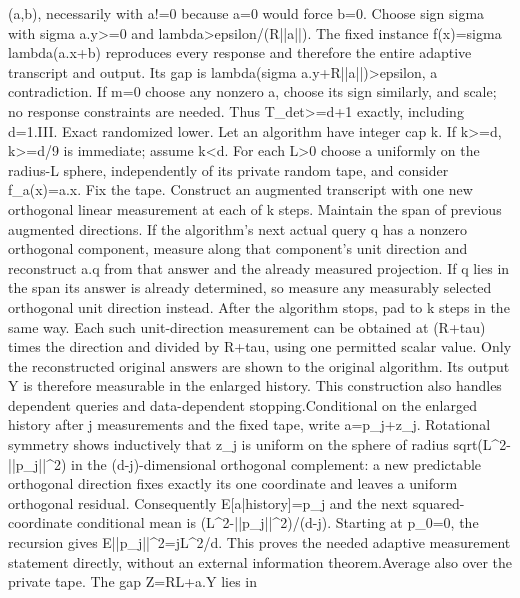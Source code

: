 \documentclass[10pt,a4paper]{article}
\begin{document}
(a,\allowbreak{}b),\allowbreak{} necessarily with a!=\allowbreak{}0 because a=\allowbreak{}0 would force b=\allowbreak{}0. Choose sign sigma with sigma a.y>=\allowbreak{}0 and lambda>epsilon/\allowbreak{}(R||a||). The fixed instance f(x)=\allowbreak{}sigma lambda(a.x+b) reproduces every response and therefore the entire adaptive transcript and output. Its gap is lambda(sigma a.y+R||a||)>epsilon,\allowbreak{} a contradiction. If m=\allowbreak{}0 choose any nonzero a,\allowbreak{} choose its sign similarly,\allowbreak{} and scale;\allowbreak{} no response constraints are needed. Thus T\_\allowbreak{}det>=\allowbreak{}d+1 exactly,\allowbreak{} including d=\allowbreak{}1.\newline{}\newline{}III. Exact randomized lower. Let an algorithm have integer cap k. If k>=\allowbreak{}d,\allowbreak{} k>=\allowbreak{}d/\allowbreak{}9 is immediate;\allowbreak{} assume k<d. For each L>0 choose a uniformly on the radius-L sphere,\allowbreak{} independently of its private random tape,\allowbreak{} and consider f\_\allowbreak{}a(x)=\allowbreak{}a.x. Fix the tape. Construct an augmented transcript with one new orthogonal linear measurement at each of k steps. Maintain the span of previous augmented directions. If the algorithm's next actual query q has a nonzero orthogonal component,\allowbreak{} measure along that component's unit direction and reconstruct a.q from that answer and the already measured projection. If q lies in the span its answer is already determined,\allowbreak{} so measure any measurably selected orthogonal unit direction instead. After the algorithm stops,\allowbreak{} pad to k steps in the same way. Each such unit-direction measurement can be obtained at (R+tau) times the direction and divided by R+tau,\allowbreak{} using one permitted scalar value. Only the reconstructed original answers are shown to the original algorithm. Its output Y is therefore measurable in the enlarged history. This construction also handles dependent queries and data-dependent stopping.\newline{}\newline{}Conditional on the enlarged history after j measurements and the fixed tape,\allowbreak{} write a=\allowbreak{}p\_\allowbreak{}j+z\_\allowbreak{}j. Rotational symmetry shows inductively that z\_\allowbreak{}j is uniform on the sphere of radius sqrt(L\textasciicircum{}2-||p\_\allowbreak{}j||\textasciicircum{}2) in the (d-j)-dimensional orthogonal complement:\allowbreak{} a new predictable orthogonal direction fixes exactly its one coordinate and leaves a uniform orthogonal residual. Consequently E[a|history]=\allowbreak{}p\_\allowbreak{}j and the next squared-coordinate conditional mean is (L\textasciicircum{}2-||p\_\allowbreak{}j||\textasciicircum{}2)/\allowbreak{}(d-j). Starting at p\_\allowbreak{}0=\allowbreak{}0,\allowbreak{} the recursion gives E||p\_\allowbreak{}j||\textasciicircum{}2=\allowbreak{}jL\textasciicircum{}2/\allowbreak{}d. This proves the needed adaptive measurement statement directly,\allowbreak{} without an external information theorem.\newline{}\newline{}Average also over the private tape. The gap Z=\allowbreak{}RL+a.Y lies in 
\end{document}
